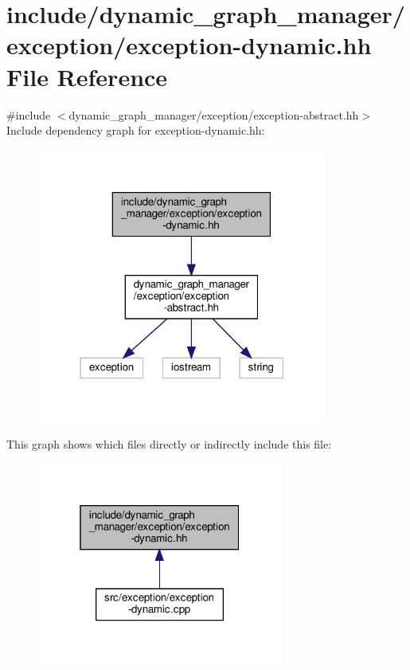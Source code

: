 \hypertarget{exception-dynamic_8hh}{}\section{include/dynamic\+\_\+graph\+\_\+manager/exception/exception-\/dynamic.hh File Reference}
\label{exception-dynamic_8hh}
{\ttfamily \#include $<$dynamic\+\_\+graph\+\_\+manager/exception/exception-\/abstract.\+hh$>$}\newline
Include dependency graph for exception-\/dynamic.hh\+:
\nopagebreak
\begin{figure}[H]
\begin{center}
\leavevmode
\includegraphics[width=271pt]{exception-dynamic_8hh__incl}
\end{center}
\end{figure}
This graph shows which files directly or indirectly include this file\+:
\nopagebreak
\begin{figure}[H]
\begin{center}
\leavevmode
\includegraphics[width=229pt]{exception-dynamic_8hh__dep__incl}
\end{center}
\end{figure}
